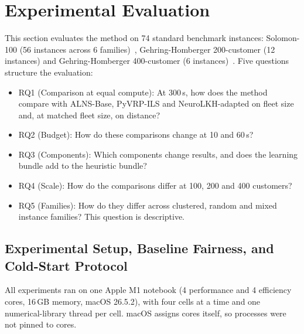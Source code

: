 \documentclass{ieeeaccess}
\begin{document}
\section{Experimental Evaluation}
\label{sec:experiments}

This section evaluates the method on 74 standard benchmark instances: Solomon-100 (56 instances across 6 families)~\cite{Solomon1987}, Gehring-Homberger 200-customer (12 instances) and Gehring-Homberger 400-customer (6 instances)~\cite{gehring1999parallel}. Five questions structure the evaluation:
\begin{itemize}
    \item RQ1 (Comparison at equal compute): At 300\,s, how does the method compare with ALNS-Base, PyVRP-ILS and NeuroLKH-adapted on fleet size and, at matched fleet size, on distance?
    \item RQ2 (Budget): How do these comparisons change at 10 and 60\,s?
    \item RQ3 (Components): Which components change results, and does the learning bundle add to the heuristic bundle?
    \item RQ4 (Scale): How do the comparisons differ at 100, 200 and 400 customers?
    \item RQ5 (Families): How do they differ across clustered, random and mixed instance families? This question is descriptive.
\end{itemize}

\subsection{Experimental Setup, Baseline Fairness, and Cold-Start Protocol}
\label{sec:setup}
\label{sec:exp_setup}

All experiments ran on one Apple M1 notebook (4 performance and 4 efficiency cores, 16\,GB memory, macOS 26.5.2), with four cells at a time and one numerical-library thread per cell. macOS assigns cores itself, so processes were not pinned to cores.
\end{document}
